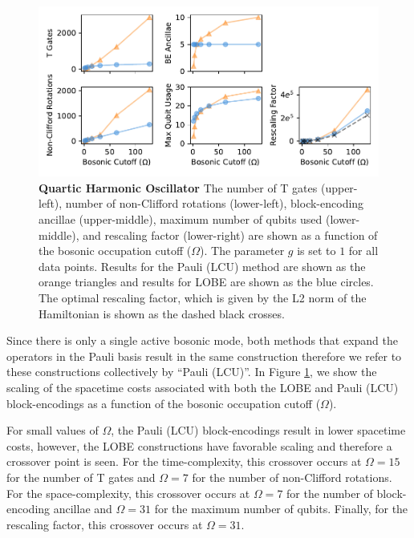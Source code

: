 \begin{figure}
    \label{fig:qosc}
    \includegraphics[width = 16cm]{figures/quartic_oscillator.pdf}
    \caption{
        \textbf{Quartic Harmonic Oscillator}
        The number of T gates (upper-left), number of non-Clifford rotations (lower-left), block-encoding ancillae (upper-middle), maximum number of qubits used (lower-middle), and rescaling factor (lower-right) are shown as a function of the bosonic occupation cutoff ($\Omega$).
        The parameter $g$ is set to $1$ for all data points.
        Results for the Pauli (LCU) method are shown as the orange triangles and results for LOBE are shown as the blue circles.
        The optimal rescaling factor, which is given by the L2 norm of the Hamiltonian is shown as the dashed black crosses.
    }
\end{figure}

Since there is only a single active bosonic mode, both methods that expand the operators in the Pauli basis result in the same construction therefore we refer to these constructions collectively by ``Pauli (LCU)''.
In Figure \ref{fig:qosc}, we show the scaling of the spacetime costs associated with both the LOBE and Pauli (LCU) block-encodings as a function of the bosonic occupation cutoff ($\Omega$).

For small values of $\Omega$, the Pauli (LCU) block-encodings result in lower spacetime costs, however, the LOBE constructions have favorable scaling and therefore a crossover point is seen.
For the time-complexity, this crossover occurs at $\Omega = 15$ for the number of T gates and $\Omega = 7$ for the number of non-Clifford rotations.
For the space-complexity, this crossover occurs at $\Omega = 7$ for the number of block-encoding ancillae and $\Omega = 31$ for the maximum number of qubits.
Finally, for the rescaling factor, this crossover occurs at $\Omega = 31$.
